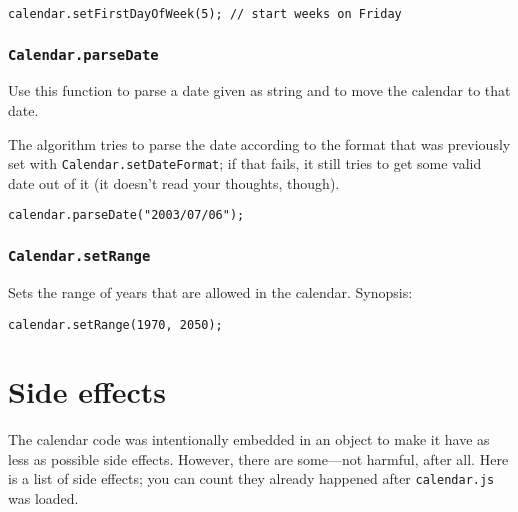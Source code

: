 \documentclass[a4paper,10pt]{article}
\begin{document}
\begin{verbatim}
calendar.setFirstDayOfWeek(5); // start weeks on Friday
\end{verbatim}

\subsubsection{\texttt{Calendar.parseDate}}\label{sec:Calendar.parseDate}

Use this function to parse a date given as string and to move the calendar to
that date.

The algorithm tries to parse the date according to the format that was
previously set with \texttt{Calendar.setDateFormat}; if that fails, it still
tries to get some valid date out of it (it doesn't read your thoughts, though).

\begin{verbatim}
calendar.parseDate("2003/07/06");
\end{verbatim}

\subsubsection{\texttt{Calendar.setRange}}\label{sec:Calendar.setRange}

Sets the range of years that are allowed in the calendar.  Synopsis:

\begin{verbatim}
calendar.setRange(1970, 2050);
\end{verbatim}







\section{Side effects}

The calendar code was intentionally embedded in an object to make it have as
less as possible side effects.  However, there are some---not harmful, after
all.  Here is a list of side effects; you can count they already happened after
\texttt{calendar.js} was loaded.
\end{document}
